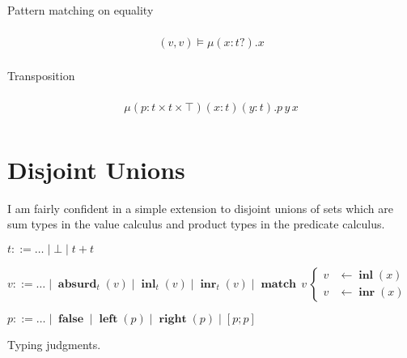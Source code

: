 \documentclass[twocolumn]{scrartcl}
\newcommand{\bnfdef}{\mathbin{::=}}
\DeclareMathOperator{\absurd}{\textbf{absurd}}
\DeclareMathOperator{\inl}{\textbf{inl}}
\DeclareMathOperator{\inr}{\textbf{inr}}
\DeclareMathOperator{\false}{\textbf{false}}
\DeclareMathOperator{\lft}{\textbf{left}}
\DeclareMathOperator{\rgt}{\textbf{right}}
\DeclareMathOperator{\case}{\textbf{match}}
\begin{document}
Pattern matching on equality

\begin{multline*}
  \\
   ( v , v ) \models \mu (x \colon t ?). x\\
\end{multline*}

Transposition

\begin{multline*}
  \\
   \mu (p \colon t \times t \times \top) (x \colon t) (y \colon t). p \, y \, x\\
\end{multline*}

\section*{Disjoint Unions}

I am fairly confident in a simple extension to disjoint unions
of sets which are sum types in the value calculus and product types in
the predicate calculus.

\begin{description}[nosep]
\item[Types] \hfill \( t \bnfdef \ldots \mid \bot \mid t + t \)
\item[Values] \hfill \( v \bnfdef \ldots \mid \absurd_t(v) \mid \inl_t(v) \mid \inr_t(v) \mid
  \case \, v \,
  \begin{cases}
    v & \leftarrow \inl(x) \\
    v & \leftarrow \inr(x)
  \end{cases}
  \)
\item[Predicates] \hfill \( p \bnfdef \ldots \mid \false \mid \lft(p) \mid \rgt(p) \mid [ p ; p ] \)
\end{description}

Typing judgments.
\end{document}
